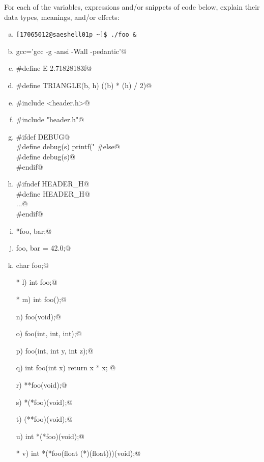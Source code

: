 \documentclass[a4paper,12pt]{article}
\begin{document}
For each of the variables, expressions and/or snippets of code below,
explain their data types, meanings, and/or effects:

\begin{enumerate}[a)]
	\item \texttt{[17065012@saeshell01p \textasciitilde]\$ ./foo \&}
	\item \lstinline@alias gcc='gcc -g -ansi -Wall -pedantic'@
	\item \lstinline@#define E 2.71828183f@
	\item \lstinline@#define TRIANGLE(b, h) ((b) * (h) / 2)@
	\item \lstinline@#include <header.h>@
	\item \lstinline@#include "header.h"@
	\item \lstinline@#ifdef DEBUG@\\
	      \lstinline@        #define debug(s) printf("%s\n", s)@\\
	      \lstinline@#else@\\
	      \lstinline@        #define debug(s)@\\
	      \lstinline@#endif@
	\item \lstinline@#ifndef HEADER_H@\\
	      \lstinline@#define HEADER_H@\\
	      \lstinline@...@\\
	      \lstinline@#endif@
	\item \lstinline@int *foo, bar;@
	\item \lstinline@double foo, bar = 42.0;@
	\item \lstinline@unsigned char foo;@
	\item[* l)] \lstinline@extern int foo;@
	\item[* m)] \lstinline@extern int foo();@
	\item[n)] \lstinline@int foo(void);@
	\item[o)] \lstinline@int foo(int, int, int);@
	\item[p)] \lstinline@int foo(int, int y, int z);@
	\item[q)] \lstinline@static int foo(int x) { return x * x; }@
	\item[r)] \lstinline@int **foo(void);@
	\item[s)] \lstinline@int *(*foo)(void);@
	\item[t)] \lstinline@int (**foo)(void);@
	\item[u)] \lstinline@typedef int *(*foo)(void);@
	\item[* v)]
	      \lstinline@typedef int *(*foo(float (*)(float)))(void);@

\end{enumerate}
\end{document}
